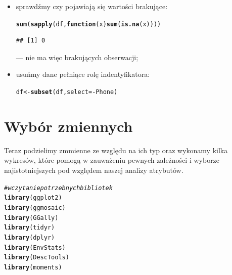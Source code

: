 \documentclass{article}\usepackage[]{graphicx}\usepackage[]{color}
\makeatletter
\newcommand{\hlcom}[1]{\textcolor[rgb]{0.678,0.584,0.686}{\textit{#1}}}%
\newcommand{\hlopt}[1]{\textcolor[rgb]{0,0,0}{#1}}%
\newcommand{\hlstd}[1]{\textcolor[rgb]{0.345,0.345,0.345}{#1}}%
\newcommand{\hlkwa}[1]{\textcolor[rgb]{0.161,0.373,0.58}{\textbf{#1}}}%
\newcommand{\hlkwb}[1]{\textcolor[rgb]{0.69,0.353,0.396}{#1}}%
\newcommand{\hlkwc}[1]{\textcolor[rgb]{0.333,0.667,0.333}{#1}}%
\newcommand{\hlkwd}[1]{\textcolor[rgb]{0.737,0.353,0.396}{\textbf{#1}}}%
\newenvironment{kframe}{%
 \def\at@end@of@kframe{}%
 \ifinner\ifhmode%
  \def\at@end@of@kframe{\end{minipage}}%
  \begin{minipage}{\columnwidth}%
 \fi\fi%
 \def\FrameCommand##1{\hskip\@totalleftmargin \hskip-\fboxsep
 \colorbox{shadecolor}{##1}\hskip-\fboxsep
     \hskip-\linewidth \hskip-\@totalleftmargin \hskip\columnwidth}%
 \MakeFramed {\advance\hsize-\width
   \@totalleftmargin\z@ \linewidth\hsize
   \@setminipage}}%
 {\par\unskip\endMakeFramed%
 \at@end@of@kframe}
\newenvironment{knitrout}{}{} %
\makeatother
\begin{document}
\begin{itemize}
\item sprawdźmy czy pojawiają się wartości brakujące:
\begin{knitrout}
\color{fgcolor}\begin{kframe}
\begin{alltt}
\hlkwd{sum}\hlstd{(}\hlkwd{sapply}\hlstd{(df,} \hlkwa{function}\hlstd{(}\hlkwc{x}\hlstd{)} \hlkwd{sum}\hlstd{(}\hlkwd{is.na}\hlstd{(x))))}
\end{alltt}
\begin{verbatim}
## [1] 0
\end{verbatim}
\end{kframe}
\end{knitrout}
--- nie ma więc brakujących obserwacji;
\item usuńmy dane pełniące rolę indentyfikatora:
\begin{knitrout}
\color{fgcolor}\begin{kframe}
\begin{alltt}
\hlstd{df} \hlkwb{<-} \hlkwd{subset}\hlstd{(df,} \hlkwc{select}\hlstd{=}\hlopt{-}\hlstd{Phone)}
\end{alltt}
\end{kframe}
\end{knitrout}

\end{itemize}

\section{Wybór zmiennych}
Teraz podzielimy zmmienne ze względu na ich typ oraz wykonamy kilka wykresów, które pomogą w zauważeniu pewnych zależności i wyborze najistotniejszych pod względem naszej analizy atrybutów.
\begin{knitrout}
\color{fgcolor}\begin{kframe}
\begin{alltt}
\hlcom{# wczytanie potrzebnych bibliotek}
\hlkwd{library}\hlstd{(ggplot2)}
\hlkwd{library}\hlstd{(ggmosaic)}
\hlkwd{library}\hlstd{(GGally)}
\hlkwd{library}\hlstd{(tidyr)}
\hlkwd{library}\hlstd{(dplyr)}
\hlkwd{library}\hlstd{(EnvStats)}
\hlkwd{library}\hlstd{(DescTools)}
\hlkwd{library}\hlstd{(moments)}
\end{alltt}
\end{kframe}
\end{knitrout}
\end{document}
